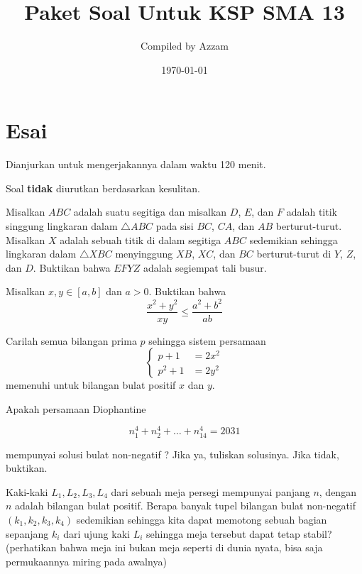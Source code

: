 \documentclass[12pt]{scrartcl}
\begin{document}
	\title{Paket Soal Untuk KSP SMA 13} %
	\date{\today}
	\author{Compiled by Azzam}
	\maketitle

\renewcommand*\contentsname{Daftar Isi}
\tableofcontents

\newpage
	

	\section{Esai}
	Dianjurkan untuk mengerjakannya dalam waktu 120 menit.
	
	Soal \textbf{tidak} diurutkan berdasarkan kesulitan. 
	
	\begin{soalbaru}
	Misalkan $ABC$ adalah suatu segitiga dan misalkan $D$, $E$, dan $F$ adalah titik singgung lingkaran dalam $\triangle ABC$ pada sisi $BC$, $CA$, dan $AB$ berturut-turut. Misalkan $X$ adalah sebuah titik di dalam segitiga $ABC$ sedemikian sehingga lingkaran dalam $\triangle XBC$ menyinggung $XB$, $XC$, dan $BC$ berturut-turut di $Y$, $Z$, dan $D$. Buktikan bahwa $EFYZ$ adalah segiempat tali busur.
	\end{soalbaru}
	
	
	
	\begin{soalbaru}
	Misalkan $x,y \in [a,b]$ dan $a>0$. Buktikan bahwa $$\dfrac{x^2+y^2}{xy} \le \dfrac{a^2+b^2}{ab}$$
	\end{soalbaru}
	
	
	
	\begin{soalbaru}
	Carilah semua bilangan prima $p$ sehingga sistem persamaan
	$$\begin{cases}
	p+1 &=  2x^2\\
	p^2 + 1 &= 2y^2
	\end{cases}$$
	memenuhi untuk bilangan bulat positif $x$ dan $y$.
	\end{soalbaru}
	
	\begin{soalbaru}
	Apakah persamaan Diophantine

	$$n_{1}^4+n_{2}^4+\dots+n_{14}^4 = 2031$$

	mempunyai solusi bulat non-negatif ? Jika ya, tuliskan solusinya. Jika tidak, buktikan.
	\end{soalbaru}
	
	\newpage
	\begin{soalbaru}
	Kaki-kaki $L_1,L_2,L_3,L_4$ dari sebuah meja persegi mempunyai panjang $n$, dengan $n$ adalah bilangan bulat positif. Berapa banyak tupel bilangan bulat non-negatif $(k_1,k_2,k_3,k_4)$ sedemikian sehingga kita dapat memotong sebuah bagian sepanjang $k_i$ dari ujung kaki $L_i$ sehingga meja tersebut dapat tetap stabil? (perhatikan bahwa meja ini bukan meja seperti di dunia nyata, bisa saja permukaannya miring pada awalnya)
	\end{soalbaru}
	
	
\end{document}
